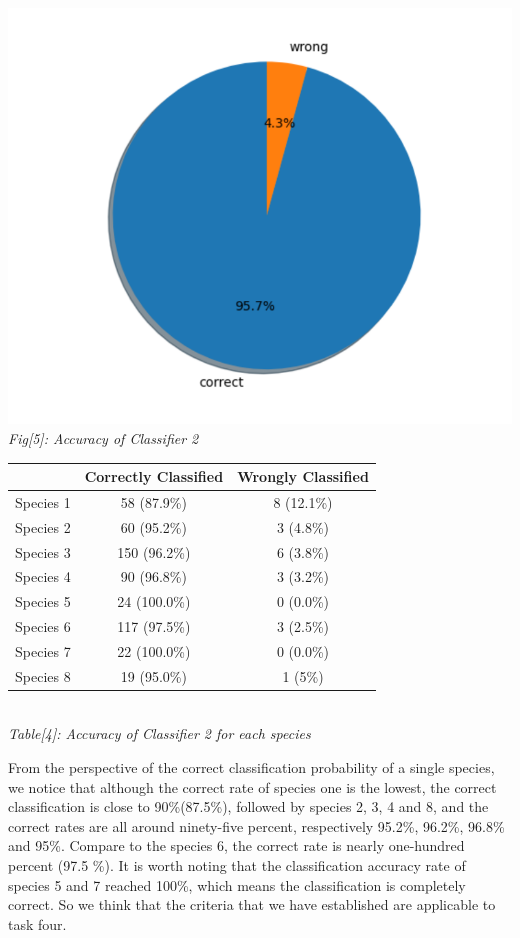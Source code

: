 \documentclass[12pt]{article}
\begin{document}
			\begin{center}
				\includegraphics[scale=0.55]{fig4} \\
				\textit{Fig[5]: Accuracy of Classifier 2} \\
				\vspace{1cm}
				\begin{tabular}{||c||c|c||}
					\hline
					& Correctly Classified & Wrongly Classified \\
					\hline \hline
					Species 1 & 58 (87.9\%) & 8 (12.1\%) \\
					\hline
					Species 2 & 60 (95.2\%) & 3 (4.8\%) \\
					\hline
					Species 3 & 150 (96.2\%) & 6 (3.8\%) \\
					\hline
					Species 4 & 90 (96.8\%) & 3 (3.2\%) \\
					\hline
					Species 5 & 24 (100.0\%) & 0 (0.0\%) \\
					\hline
					Species 6 & 117 (97.5\%) & 3 (2.5\%) \\
					\hline
					Species 7 & 22 (100.0\%) & 0 (0.0\%) \\
					\hline
					Species 8 & 19 (95.0\%) & 1 (5\%) \\
					\hline
				\end{tabular} \\
				\vspace{3mm}
				\textit{Table[4]: Accuracy of Classifier 2 for each species}
			\end{center}
			
			From the perspective of the correct classification probability of a single species, we notice that although the correct rate of species one is the lowest, the correct classification is close to 90\%(87.5\%), followed by species 2, 3, 4 and 8, and the correct rates are all around ninety-five percent, respectively 95.2\%, 96.2\%, 96.8\% and 95\%. Compare to the species 6, the correct rate is nearly one-hundred percent (97.5 \%).  It is worth noting that the classification accuracy rate of species 5 and 7 reached 100\%, which means the classification is completely correct. So we think that the criteria that we have established are applicable to task four.
			
\end{document}
